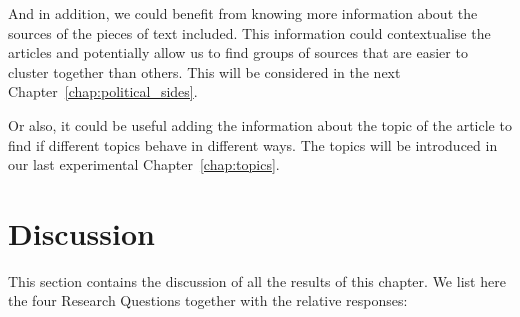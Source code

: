 And in addition, we could benefit from knowing more information about the sources of the pieces of text included. This information could contextualise the articles and potentially allow us to find groups of sources that are easier to cluster together than others. This will be considered in the next Chapter~\ref{chap:political_sides}.

Or also, it could be useful adding the information about the topic of the article to find if different topics behave in different ways. The topics will be introduced in our last experimental Chapter~\ref{chap:topics}.

\section{\statusgreen Discussion}

This section contains the discussion of all the results of this chapter. We list here the four Research Questions together with the relative responses:

